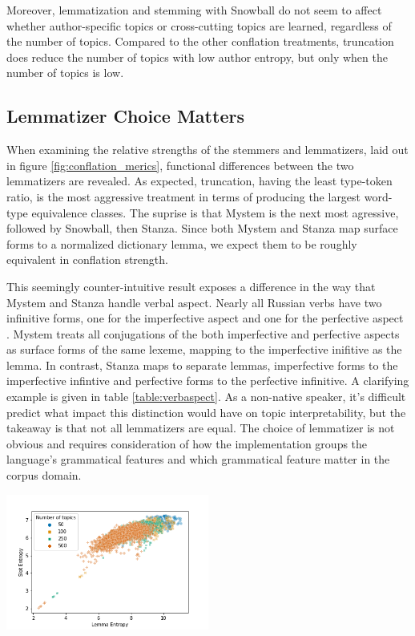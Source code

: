 \documentclass[11pt,a4paper]{article}
\begin{document}
Moreover, lemmatization and stemming with Snowball do not seem to affect whether author-specific topics or cross-cutting topics are learned, regardless of the number of topics. Compared to the other conflation treatments, truncation does reduce the number of topics with low author entropy, but only when the number of topics is low.

\subsection{Lemmatizer Choice Matters}

When examining the relative strengths of the stemmers and lemmatizers, laid out in figure \ref{fig:conflation_merics}, functional differences between the two lemmatizers are revealed. As expected, truncation, having the least type-token ratio, is the most aggressive treatment in terms of producing the largest word-type equivalence classes. The suprise is that Mystem is the next most agressive, followed by Snowball, then Stanza. Since both Mystem and Stanza map surface forms to a normalized dictionary lemma, we expect them to be roughly equivalent in conflation strength.

This seemingly counter-intuitive result exposes a difference in the way that Mystem and Stanza handle verbal aspect. Nearly all Russian verbs have two infinitive forms, one for the imperfective aspect and one for the perfective aspect \cite{wade2020comprehensive}. Mystem treats all conjugations of the both imperfective and perfective aspects as surface forms of the same lexeme, mapping to the imperfective inifitive as the lemma. In contrast, Stanza maps to separate lemmas, imperfective forms to the imperfective infintive and perfective forms to the perfective infinitive. A clarifying example is given in table \ref{table:verbaspect}. As a non-native speaker, it's difficult predict what impact this distinction would have on topic interpretability, but the takeaway is that not all lemmatizers are equal. The choice of lemmatizer is not obvious and requires consideration of how the implementation groups the language's grammatical features and which grammatical feature matter in the corpus domain.

\begin{center}
    \includegraphics[width=0.5\textwidth]{lemma_slot_entropy_scatter.png}
    \label{fig:lemma_vs_slot_entropy}
\end{center}
\end{document}
